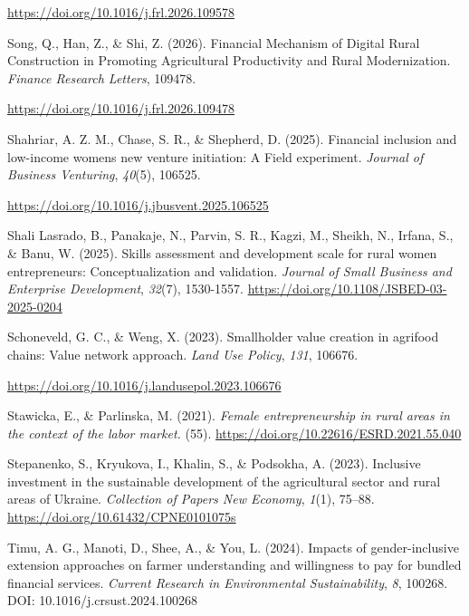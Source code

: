 ﻿\documentclass[sn-mathphys-num]{sn-jnl}
\newcommand{\hl}[1]{#1}
\begin{document}
\href{https://doi.org/10.1016/j.frl.2026.109578}{\hl{https://doi.org/10.1016/j.frl.2026.109578}}

\hl{Song, Q., Han, Z., \& Shi, Z. (2026). Financial Mechanism of Digital
Rural Construction in Promoting Agricultural Productivity and Rural
Modernization. \emph{Finance Research Letters}, 109478.}

\href{https://doi.org/10.1016/j.frl.2026.109478}{\hl{https://doi.org/10.1016/j.frl.2026.109478}}

\hl{Shahriar, A. Z. M., Chase, S. R., \& Shepherd, D. (2025). Financial
inclusion and low-income women\textquotesingle s new venture initiation:
A Field experiment. \emph{Journal of Business Venturing}, \emph{40}(5),
106525.}

\href{https://doi.org/10.1016/j.jbusvent.2025.106525}{\hl{https://doi.org/10.1016/j.jbusvent.2025.106525}}

\hl{Shali Lasrado, B., Panakaje, N., Parvin, S. R., Kagzi, M., Sheikh,
N., Irfana, S., \& Banu, W. (2025). Skills assessment and development
scale for rural women entrepreneurs: Conceptualization and validation.
\emph{Journal of Small Business and Enterprise Development},
\emph{32}(7), 1530-1557.}
\href{https://doi.org/10.1108/JSBED-03-2025-0204}{\hl{https://doi.org/10.1108/JSBED-03-2025-0204}}

\hl{Schoneveld, G. C., \& Weng, X. (2023). Smallholder value creation in
agrifood chains: Value network approach. \emph{Land Use Policy},
\emph{131}, 106676.}

\href{https://doi.org/10.1016/j.landusepol.2023.106676}{\hl{https://doi.org/10.1016/j.landusepol.2023.106676}}

\hl{Stawicka, E., \& Parlinska, M. (2021). \emph{Female entrepreneurship
in rural areas in the context of the labor market.} (55).}
\href{https://doi.org/10.22616/ESRD.2021.55.040}{\hl{https://doi.org/10.22616/ESRD.2021.55.040}}

\hl{Stepanenko, S., Kryukova, I., Khalin, S., \& Podsokha, A. (2023).
Inclusive investment in the sustainable development of the agricultural
sector and rural areas of Ukraine. \emph{Collection of Papers New
Economy}, \emph{1}(1), 75--88.}
\href{https://doi.org/10.61432/CPNE0101075s}{\hl{https://doi.org/10.61432/CPNE0101075s}}

\hl{Timu, A. G., Manoti, D., Shee, A., \& You, L. (2024). Impacts of
gender-inclusive extension approaches on farmer understanding and
willingness to pay for bundled financial services. \emph{Current
Research in Environmental Sustainability}, \emph{8}, 100268.
DOI: 10.1016/j.crsust.2024.100268}
\end{document}
